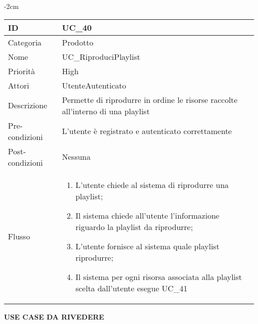 \begin{center}
\begin{table}[bp]
    \centering
    \addtolength{\leftskip} {-2cm}
\begin{tabular}{ |p{2.6cm}|p{13cm}|  }
\hline
ID & UC\_40\\\hline
Categoria & Prodotto \\\hline
Nome & UC\_RiproduciPlaylist\\\hline
Priorità & High \\\hline
Attori &  UtenteAutenticato \\\hline
Descrizione & Permette di riprodurre in ordine le risorse raccolte all'interno di una playlist\\\hline
Pre-condizioni & L'utente è registrato e autenticato correttamente\\\hline
Post-condizioni & Nessuna\\\hline
Flusso &  	\vspace{-5mm} \begin{enumerate}
		\item L'utente chiede al sistema di riprodurre una playlist;
		\item Il sistema chiede all'utente l'informazione riguardo la playlist da riprodurre;
		\item L'utente fornisce al sistema quale playlist riprodurre;
		\item Il sistema per ogni risorsa associata alla playlist scelta dall'utente esegue UC\_41
		\end{enumerate}\\\hline
\end{tabular}
\label{table_use_case:40}\newline
\end{table}


\textbf{USE CASE DA RIVEDERE} \newline


\end{center}
